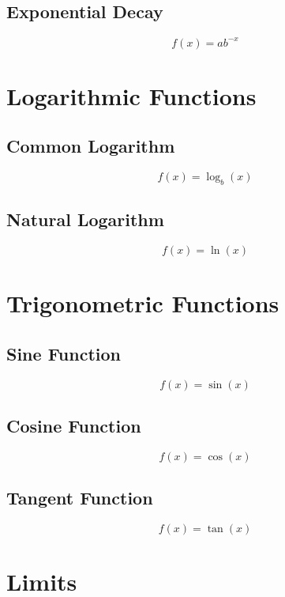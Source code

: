 \documentclass{book}
\begin{document}
\subsection{Exponential Decay}
\begin{equation}
    f(x) = ab^{-x}
\end{equation}

\section{Logarithmic Functions}
\subsection{Common Logarithm}
\begin{equation}
    f(x) = \log_b(x)
\end{equation}

\subsection{Natural Logarithm}
\begin{equation}
    f(x) = \ln(x)
\end{equation}

\section{Trigonometric Functions}
\subsection{Sine Function}
\begin{equation}
    f(x) = \sin(x)
\end{equation}

\subsection{Cosine Function}
\begin{equation}
    f(x) = \cos(x)
\end{equation}

\subsection{Tangent Function}
\begin{equation}
    f(x) = \tan(x)
\end{equation}

\section{Limits}
\end{document}
